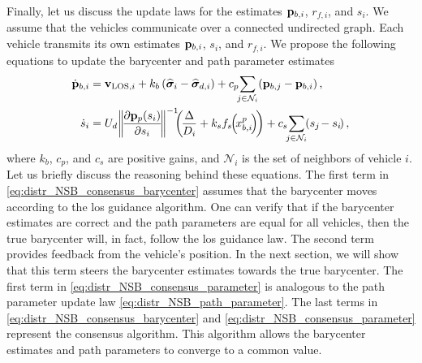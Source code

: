 Finally, let us discuss the update laws for the estimates $\mathbf{p}_{b, i}$, $r_{f, i}$, and $s_i$.
We assume that the vehicles communicate over a connected undirected graph.
Each vehicle transmits its own estimates $\mathbf{p}_{b, i}$, $s_i$, and $r_{f, i}$.
We propose the following equations to update the barycenter and path parameter estimates
\begin{align}
    \dot{\mat{p}}_{b, i} &= \ivel_{{\rm LOS}, i} + k_b\left(\widehat{\bs{\sigma}}_i - \widehat{\bs{\sigma}}_{d,i}\right) + c_p \!\! \sum_{j \in \mathcal{N}_i} \! \left(\mat{p}_{b, j} - \mat{p}_{b, i}\right),  \label{eq:distr_NSB_consensus_barycenter} \\
    \dot{s}_i &= U_{d\!} \norm{\!\frac{\partial \mat{p}_p(s_i)}{\partial s_i}\!}^{-1} \!\!\! \left(\!\frac{\Delta}{D_i} + k_s f_{s\!}\!\left(\!x_{b, i\!}^p\right)\!\right) + c_s \!\! \sum_{j \in \mathcal{N}_i}\!\! \left(s_{j\!} - s_{i\!}\right), \label{eq:distr_NSB_consensus_parameter}
\end{align}
where $k_b$, $c_p$, and $c_s$ are positive gains, and $\mathcal{N}_i$ is the set of neighbors of vehicle $i$.
Let us briefly discuss the reasoning behind these equations.
The first term in \eqref{eq:distr_NSB_consensus_barycenter} assumes that the barycenter moves according to the \gls{los} guidance algorithm.
One can verify that if the barycenter estimates are correct and the path parameters are equal for all vehicles, then the true barycenter will, in fact, follow the \gls{los} guidance law.
The second term provides feedback from the vehicle's position. In the next section, we will show that this term steers the barycenter estimates towards the true barycenter.
The first term in \eqref{eq:distr_NSB_consensus_parameter} is analogous to the path parameter update law \eqref{eq:distr_NSB_path_parameter}.
The last terms in \eqref{eq:distr_NSB_consensus_barycenter} and \eqref{eq:distr_NSB_consensus_parameter} represent the consensus algorithm. This algorithm allows the barycenter estimates and path parameters to converge to a common value.

